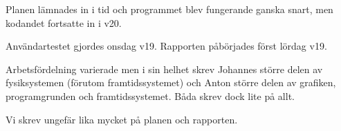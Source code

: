 Planen lämnades in i tid och programmet blev fungerande ganska snart,
men kodandet fortsatte in i v20.

Användartestet gjordes onsdag v19.
Rapporten påbörjades först lördag v19.


Arbetsfördelning varierade men i sin helhet skrev Johannes större
delen av fysiksystemen (förutom framtidssystemet) och
Anton större delen av grafiken, programgrunden och framtidssystemet.
Båda skrev dock lite på allt.

Vi skrev ungefär lika mycket på planen och rapporten.

